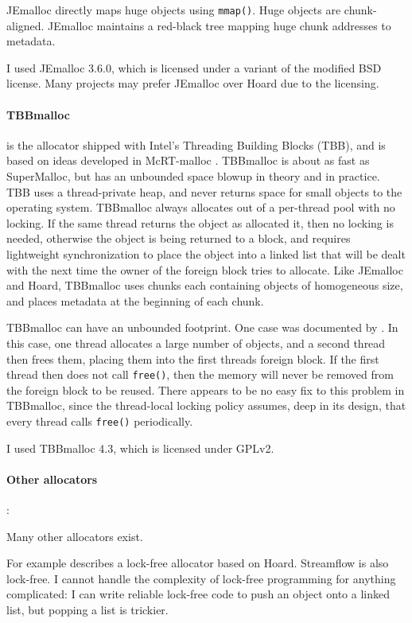 \documentclass{sigplanconf}
\newcommand{\code}[1]{\texttt{#1}}
\begin{document}
JEmalloc directly maps huge objects using \code{mmap()}.  Huge objects
are chunk-aligned.  JEmalloc maintains a red-black tree mapping huge
chunk addresses to metadata.

I used JEmalloc 3.6.0, which is licensed under a variant of the
modified BSD license.  Many projects may prefer JEmalloc over Hoard
due to the licensing.

{\paragraph{TBBmalloc}} \cite{KukanovVo07} is the allocator shipped
with Intel's Threading Building Blocks (TBB), and is based on ideas
developed in McRT-malloc \cite{HudsonSaAd06}.  TBBmalloc is about as
fast as SuperMalloc, but has an unbounded space blowup in theory and
in practice.  TBB uses a thread-private heap, and never returns space
for small objects to the operating system.  TBBmalloc always allocates
out of a per-thread pool with no locking.  If the same thread returns
the object as allocated it, then no locking is needed, otherwise the
object is being returned to a  block, and requires
lightweight synchronization to place the object into a linked list
that will be dealt with the next time the owner of the foreign block
tries to allocate.  Like JEmalloc and Hoard, TBBmalloc uses chunks
each containing objects of homogeneous size, and places metadata at
the beginning of each chunk.

TBBmalloc can have an unbounded footprint.  One case was documented by
\cite{Vyukov08}.  In this case, one thread allocates a large number of
objects, and a second thread then frees them, placing them into the
first threads foreign block.  If the first thread then does not call
\code{free()}, then the memory will never be removed from the foreign
block to be reused.  There appears to be no easy fix to this problem
in TBBmalloc, since the thread-local locking policy assumes, deep in
its design, that every thread calls \code{free()} periodically.

I used TBBmalloc 4.3, which is licensed under GPLv2.

{\paragraph{Other allocators}:} Many other allocators exist.

For example \cite{Michael04} describes a lock-free allocator based on
Hoard.  Streamflow \cite{SchneiderAnNi06} is also lock-free.  I cannot
handle the complexity of lock-free programming for anything
complicated: I can write reliable lock-free code to push an object
onto a linked list, but popping a list is trickier.
\end{document}
